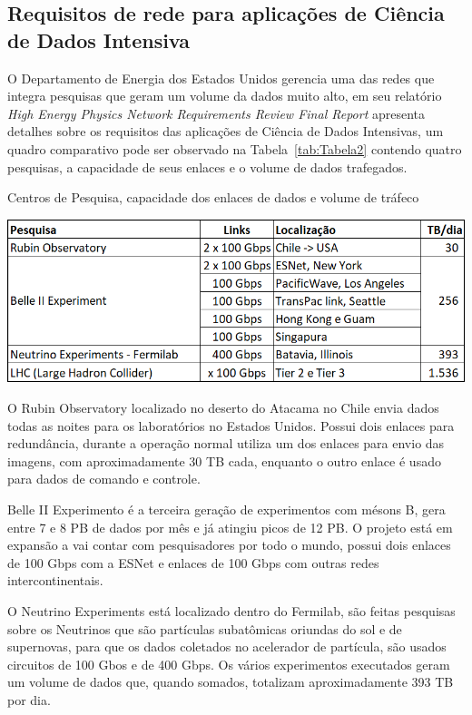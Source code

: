 \documentclass[12pt]{article}
\begin{document}
\subsection{Requisitos de rede para aplicações de Ciência de Dados Intensiva}

O Departamento de Energia dos Estados Unidos gerencia uma das redes que integra pesquisas que geram um volume da dados muito alto, em seu relatório \textit{High Energy Physics Network Requirements Review Final Report} \cite{zurawski2021} apresenta detalhes sobre os requisitos das aplicações de Ciência de Dados Intensivas, um quadro comparativo pode ser observado na Tabela~\ref{tab:Tabela2} contendo quatro pesquisas, a capacidade de seus enlaces e o volume de dados trafegados.

\begin{table}[ht]
\centering
\caption{Centros de Pesquisa, capacidade dos enlaces de dados e volume de tráfeco}
\label{tab:Tabela2}
\includegraphics[width=.7\textwidth]{volumes.png}
\end{table}

O Rubin Observatory localizado no deserto do Atacama no Chile envia dados todas as noites para os laboratórios no Estados Unidos. Possui dois enlaces para redundância, durante a operação normal utiliza um dos enlaces para envio das imagens, com aproximadamente 30 TB cada, enquanto o outro enlace é usado para dados de comando e controle.

Belle II Experimento é a terceira geração de experimentos com mésons B, gera entre 7 e 8 PB de dados por mês e já atingiu picos de 12 PB. O projeto está em expansão a vai contar com pesquisadores por todo o mundo, possui dois enlaces de 100 Gbps com a ESNet e enlaces de 100 Gbps com outras redes intercontinentais.

O Neutrino Experiments está localizado dentro do Fermilab, são feitas pesquisas sobre os Neutrinos que são partículas subatômicas oriundas do sol e de supernovas, para que os dados coletados no acelerador de partícula, são usados circuitos de 100 Gbos e de 400 Gbps. Os vários experimentos executados geram um volume de dados que, quando somados, totalizam aproximadamente 393 TB por dia.
\end{document}
